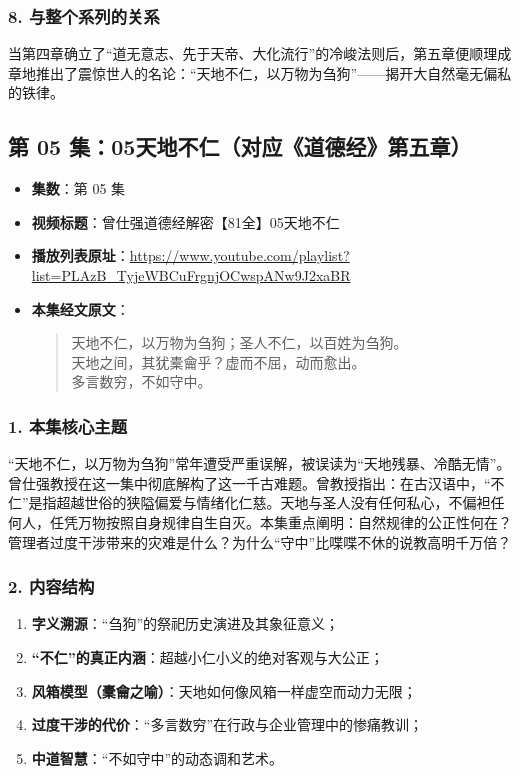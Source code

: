 \subsubsection{8. 与整个系列的关系}
当第四章确立了“道无意志、先于天帝、大化流行”的冷峻法则后，第五章便顺理成章地推出了震惊世人的名论：“天地不仁，以万物为刍狗”——揭开大自然毫无偏私的铁律。

\clearpage

\subsection{第 05 集：05天地不仁（对应《道德经》第五章）}
\label{sec:ep05}

\begin{itemize}
    \item \textbf{集数}：第 05 集
    \item \textbf{视频标题}：曾仕强道德经解密【81全】05天地不仁
    \item \textbf{播放列表原址}：\url{https://www.youtube.com/playlist?list=PLAzB_TyjeWBCuFrgnjOCwspANw9J2xaBR}
    \item \textbf{本集经文原文}：
    \begin{quote}\kaishu
    天地不仁，以万物为刍狗；圣人不仁，以百姓为刍狗。\\
    天地之间，其犹橐龠乎？虚而不屈，动而愈出。\\
    多言数穷，不如守中。
    \end{quote}
\end{itemize}

\subsubsection{1. 本集核心主题}
“天地不仁，以万物为刍狗”常年遭受严重误解，被误读为“天地残暴、冷酷无情”。曾仕强教授在这一集中彻底解构了这一千古难题。曾教授指出：在古汉语中，“不仁”是指超越世俗的狭隘偏爱与情绪化仁慈。天地与圣人没有任何私心，不偏袒任何人，任凭万物按照自身规律自生自灭。本集重点阐明：自然规律的公正性何在？管理者过度干涉带来的灾难是什么？为什么“守中”比喋喋不休的说教高明千万倍？

\subsubsection{2. 内容结构}
\begin{enumerate}
    \item \textbf{字义溯源}：“刍狗”的祭祀历史演进及其象征意义；
    \item \textbf{“不仁”的真正内涵}：超越小仁小义的绝对客观与大公正；
    \item \textbf{风箱模型（橐龠之喻）}：天地如何像风箱一样虚空而动力无限；
    \item \textbf{过度干涉的代价}：“多言数穷”在行政与企业管理中的惨痛教训；
    \item \textbf{中道智慧}：“不如守中”的动态调和艺术。
\end{enumerate}

